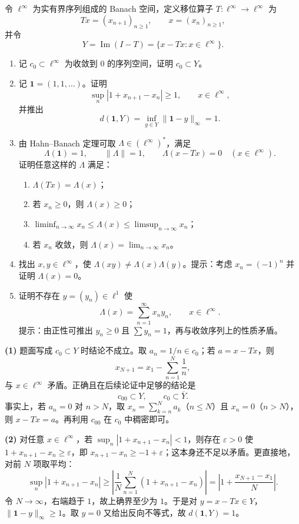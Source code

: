 \begin{problem}
令 $\ell^\infty$ 为实有界序列组成的 Banach 空间，定义移位算子
$T:\ell^\infty\to\ell^\infty$ 为
\[
 Tx=(x_{n+1})_{n\ge1},\qquad x=(x_n)_{n\ge1},
\]
并令
\[
 Y=\operatorname{Im}(I-T)=\{x-Tx:x\in\ell^\infty\}.
\]
\begin{enumerate}
 \item 记 $c_0\subset\ell^\infty$ 为收敛到 $0$ 的序列空间，证明 $c_0\subset Y$。
 \item 记 $\mathbf1=(1,1,\dots)$。证明
 \[
  \sup_n|1+x_{n+1}-x_n|\ge1,\qquad x\in\ell^\infty,
 \]
 并推出
 \[
  d(\mathbf1,Y)=\inf_{y\in Y}\|\mathbf1-y\|_\infty=1.
 \]
 \item 由 Hahn--Banach 定理可取 $\Lambda\in(\ell^\infty)^*$，满足
 \[
  \Lambda(\mathbf1)=1,\qquad \|\Lambda\|=1,\qquad
  \Lambda(x-Tx)=0\quad(x\in\ell^\infty).
 \]
 证明任意这样的 $\Lambda$ 满足：
 \begin{enumerate}
  \item $\Lambda(Tx)=\Lambda(x)$；
  \item 若 $x_n\ge0$，则 $\Lambda(x)\ge0$；
  \item $\liminf_{n\to\infty}x_n\le\Lambda(x)\le\limsup_{n\to\infty}x_n$；
  \item 若 $x_n$ 收敛，则 $\Lambda(x)=\lim_{n\to\infty}x_n$。
 \end{enumerate}
 \item 找出 $x,y\in\ell^\infty$，使
 $\Lambda(xy)\ne\Lambda(x)\Lambda(y)$。提示：考虑 $x_n=(-1)^n$ 并证明
 $\Lambda(x)=0$。
 \item 证明不存在 $y=(y_n)\in\ell^1$ 使
 \[
  \Lambda(x)=\sum_{n=1}^\infty x_ny_n,\qquad x\in\ell^\infty.
 \]
 提示：由正性可推出 $y_n\ge0$ 且 $\sum y_n=1$，再与收敛序列上的性质矛盾。
\end{enumerate}
\end{problem}

\textbf{(1)} 题面写成 $c_0\subset Y$ 时结论不成立。取 $a_n=1/n\in c_0$；若
$a=x-Tx$，则
\[
 x_{N+1}=x_1-\sum_{n=1}^N\frac1n,
\]
与 $x\in\ell^\infty$ 矛盾。正确且在后续论证中足够的结论是
\[
 c_{00}\subset Y,\qquad c_0\subset\overline Y.
\]
事实上，若 $a_n=0$ 对 $n>N$，取
$x_n=\sum_{k=n}^Na_k$（$n\le N$）且 $x_n=0$（$n>N$），则
$x-Tx=a$。再利用 $c_{00}$ 在 $c_0$ 中稠密即可。

\textbf{(2)} 对任意 $x\in\ell^\infty$，若
$\sup_n|1+x_{n+1}-x_n|<1$，则存在 $\varepsilon>0$ 使
$1+x_{n+1}-x_n\ge\varepsilon$，即
$x_{n+1}-x_n\ge-1+\varepsilon$；这本身还不足以矛盾。更直接地，对前 $N$ 项取平均：
\[
 \sup_n|1+x_{n+1}-x_n|
 \ge\left|\frac1N\sum_{n=1}^N(1+x_{n+1}-x_n)\right|
 =\left|1+\frac{x_{N+1}-x_1}{N}\right|.
\]
令 $N\to\infty$，右端趋于 $1$，故上确界至少为 $1$。于是对
$y=x-Tx\in Y$，$\|\mathbf1-y\|_\infty\ge1$。取 $y=0$ 又给出反向不等式，故
$d(\mathbf1,Y)=1$。

